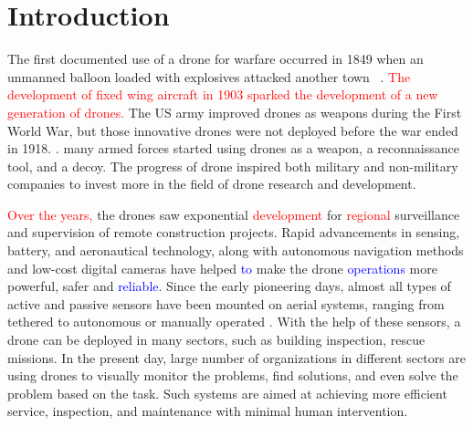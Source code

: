 \section{Introduction}
\label{introductionsection}
\noindent {} The first documented use of a drone for warfare occurred in  1849 when an unmanned balloon loaded with explosives attacked another town ~\cite{mckenna2016public}.
\textcolor{red}{
The development of fixed wing aircraft in 1903 sparked the development of a new generation of drones.}
The US army improved drones as weapons during the First World War, but those innovative drones were not deployed before the war ended in 1918. 
.
many armed forces started using drones as a weapon, a reconnaissance tool, and a decoy. The progress of drone inspired both military and non-military companies to invest more in the field of drone research and development.

\textcolor{red}{Over the years,}
the drones saw exponential \textcolor{red}{development} for \textcolor{red}{regional} surveillance and supervision of remote construction projects. Rapid advancements in sensing, battery, and aeronautical technology, along with autonomous navigation methods and low-cost digital cameras have helped \textcolor{blue}{to} make the drone \textcolor{blue}{operations} more powerful, safer and \textcolor{blue}{reliable}\cite{liu2014review}. Since the early pioneering days, almost all types of active and passive sensors have been mounted on aerial systems, ranging from tethered to autonomous or manually operated \cite{sensing2015disasters, dong2013comprehensive}. With the help of these sensors, a drone can be deployed in many sectors, such as building inspection, rescue missions.
In the present day, large number of organizations in different sectors are using drones to visually monitor the problems, 
find solutions, and even solve the problem based on the task. Such systems are aimed at achieving more efficient service, inspection, and maintenance with minimal human intervention.

